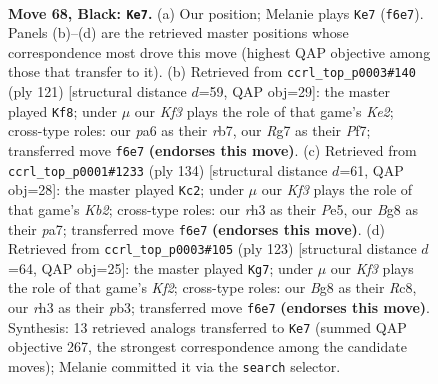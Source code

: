 \documentclass[11pt]{article}
\begin{document}
\clearpage

\begin{figure}[p]\centering
\begin{subfigure}{0.46\textwidth}\centering
\resizebox{\linewidth}{!}{%
\newchessgame
\chessboard[
  setfen={1r4b1/p1p3r1/P1p2kp1/2P2p1p/RP3P1P/7R/5K2/1N6 b - - 59 68},
  showmover=false,
  pgfstyle=straightmove, color=movearrow, markmove={f6-e7}
]}
\caption{}
\end{subfigure}\hfill
\begin{subfigure}{0.46\textwidth}\centering
\resizebox{\linewidth}{!}{%
\newchessgame
\chessboard[
  setfen={2r1b3/1R2kp2/r3p1p1/4P1P1/p1P4P/N1K5/8/4R3 b - - 46 61},
  showmover=false,
  pgfstyle=straightmove, color=movearrow, markmove={e7-f8}
]}
\caption{}
\end{subfigure}
\\[4pt]
\begin{subfigure}{0.46\textwidth}\centering
\resizebox{\linewidth}{!}{%
\newchessgame
\chessboard[
  setfen={8/p3k3/r1p1p3/1p2Pp2/1P1P2p1/P1R3P1/1K3P1r/5R2 w - - 4 68},
  showmover=false,
  pgfstyle=straightmove, color=movearrow, markmove={b2-c2}
]}
\caption{}
\end{subfigure}\hfill
\begin{subfigure}{0.46\textwidth}\centering
\resizebox{\linewidth}{!}{%
\newchessgame
\chessboard[
  setfen={2r5/4pk2/4p1p1/p1rpP2p/5P1P/RPP2RP1/2K5/8 b - - 52 62},
  showmover=false,
  pgfstyle=straightmove, color=movearrow, markmove={f7-g7}
]}
\caption{}
\end{subfigure}
\caption{\textbf{Move 68, Black: \texttt{Ke7}.} (a) Our position; Melanie plays \texttt{Ke7} (\texttt{f6e7}). Panels (b)--(d) are the retrieved master positions whose correspondence most drove this move (highest QAP objective among those that transfer to it). (b) Retrieved from \texttt{ccrl\_top\_p0003\#140} (ply 121) [structural distance $d$=59, QAP obj=29]: the master played \texttt{Kf8}; under $\mu$ our \emph{Kf3} plays the role of that game's \emph{Ke2}; cross-type roles: our \emph{p}a6 as their \emph{r}b7, our \emph{R}g7 as their \emph{P}f7; transferred move \texttt{f6e7} \textbf{(endorses this move)}. (c) Retrieved from \texttt{ccrl\_top\_p0001\#1233} (ply 134) [structural distance $d$=61, QAP obj=28]: the master played \texttt{Kc2}; under $\mu$ our \emph{Kf3} plays the role of that game's \emph{Kb2}; cross-type roles: our \emph{r}h3 as their \emph{P}e5, our \emph{B}g8 as their \emph{p}a7; transferred move \texttt{f6e7} \textbf{(endorses this move)}. (d) Retrieved from \texttt{ccrl\_top\_p0003\#105} (ply 123) [structural distance $d$=64, QAP obj=25]: the master played \texttt{Kg7}; under $\mu$ our \emph{Kf3} plays the role of that game's \emph{Kf2}; cross-type roles: our \emph{B}g8 as their \emph{R}c8, our \emph{r}h3 as their \emph{p}b3; transferred move \texttt{f6e7} \textbf{(endorses this move)}. Synthesis: 13 retrieved analogs transferred to \texttt{Ke7} (summed QAP objective 267, the strongest correspondence among the candidate moves); Melanie committed it via the \texttt{search} selector.}
\label{fig:thought-m135}
\end{figure}
\end{document}

